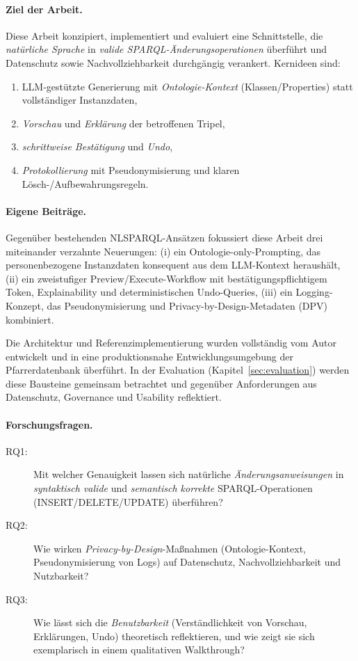 \paragraph{Ziel der Arbeit.}
Diese Arbeit konzipiert, implementiert und evaluiert eine Schnittstelle, die \emph{natürliche Sprache} in \emph{valide SPARQL-Änderungsoperationen} überführt und Datenschutz sowie Nachvollziehbarkeit durchgängig verankert. Kernideen sind:
\begin{enumerate}
\item LLM-gestützte Generierung mit \emph{Ontologie-Kontext} (Klassen/Properties) statt vollständiger Instanzdaten,
\item \emph{Vorschau} und \emph{Erklärung} der betroffenen Tripel,
\item \emph{schrittweise Bestätigung} und \emph{Undo},
\item \emph{Protokollierung} mit Pseudonymisierung und klaren Lösch-/Aufbewahrungsregeln.
\end{enumerate}

\paragraph{Eigene Beiträge.}
Gegenüber bestehenden NL{\textrightarrow}SPARQL-Ansätzen fokussiert diese Arbeit drei miteinander verzahnte Neuerungen:  
(i) ein Ontologie-only-Prompting, das personenbezogene Instanzdaten konsequent aus dem LLM-Kontext heraushält,  
(ii) ein zweistufiger Preview/Execute-Workflow mit bestätigungspflichtigem Token, Explainability und deterministischen Undo-Queries,  
(iii) ein Logging-Konzept, das Pseudonymisierung und Privacy-by-Design-Metadaten (DPV) kombiniert.

Die Architektur und Referenzimplementierung wurden vollständig vom Autor entwickelt und in eine produktionsnahe Entwicklungsumgebung der Pfarrerdatenbank überführt. In der Evaluation (Kapitel~\ref{sec:evaluation}) werden diese Bausteine gemeinsam betrachtet und gegenüber Anforderungen aus Datenschutz, Governance und Usability reflektiert.

\paragraph{Forschungsfragen.}
\begin{description}
\item[RQ1:] Mit welcher Genauigkeit lassen sich natürliche \emph{Änderungsanweisungen} in \emph{syntaktisch valide} und \emph{semantisch korrekte} SPARQL-Operationen (INSERT/DELETE/UPDATE) überführen?
\item[RQ2:] Wie wirken \emph{Privacy-by-Design}-Maßnahmen (Ontologie-Kontext, Pseudonymisierung von Logs) auf Datenschutz, Nachvollziehbarkeit und Nutzbarkeit?
\item[RQ3:] Wie lässt sich die \emph{Benutzbarkeit} (Verständlichkeit von Vorschau, Erklärungen, Undo) theoretisch reflektieren, und wie zeigt sie sich exemplarisch in einem qualitativen Walkthrough?
\end{description}

